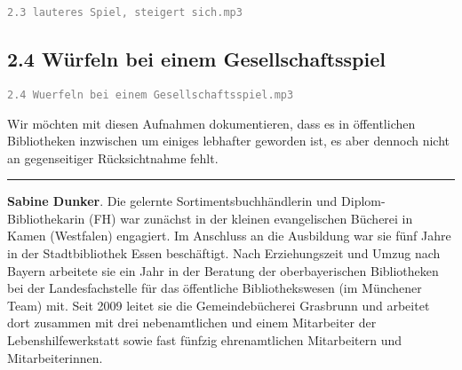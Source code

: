 \documentclass[a4paper,
fontsize=11pt,
oneside,
numbers=noperiodatend,
parskip=half-,
bibliography=totoc,
final
]{scrartcl}
\begin{document}
\textcolor{gray}{\texttt{2.3 lauteres Spiel, steigert sich.mp3}}


\hypertarget{wuxfcrfeln-bei-einem-gesellschaftsspiel}{%
\subsection{2.4 Würfeln bei einem
Gesellschaftsspiel}\label{wuxfcrfeln-bei-einem-gesellschaftsspiel}}

\textcolor{gray}{\texttt{2.4 Wuerfeln bei einem Gesellschaftsspiel.mp3}}

Wir möchten mit diesen Aufnahmen dokumentieren, dass es in öffentlichen
Bibliotheken inzwischen um einiges lebhafter geworden ist, es aber
dennoch nicht an gegenseitiger Rücksichtnahme fehlt.

\begin{center}\rule{0.5\linewidth}{0.5pt}\end{center}

\textbf{Sabine Dunker}. Die gelernte Sortimentsbuchhändlerin und
Diplom-Bibliothekarin (FH) war zunächst in der kleinen evangelischen
Bücherei in Kamen (Westfalen) engagiert. Im Anschluss an die Ausbildung
war sie fünf Jahre in der Stadtbibliothek Essen beschäftigt. Nach
Erziehungszeit und Umzug nach Bayern arbeitete sie ein Jahr in der
Beratung der oberbayerischen Bibliotheken bei der Landesfachstelle für
das öffentliche Bibliothekswesen (im Münchener Team) mit. Seit 2009
leitet sie die Gemeindebücherei Grasbrunn und arbeitet dort zusammen mit
drei nebenamtlichen und einem Mitarbeiter der Lebenshilfewerkstatt sowie
fast fünfzig ehrenamtlichen Mitarbeitern und Mitarbeiterinnen.
\end{document}
